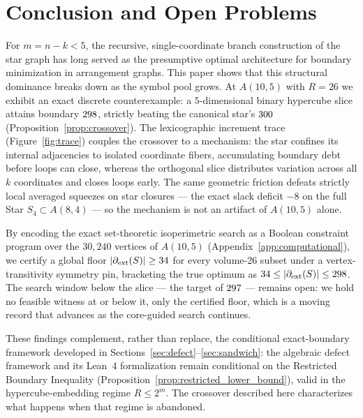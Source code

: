 \section{Conclusion and Open Problems}
\label{sec:conclusion}

For $m = n - k < 5$, the recursive, single-coordinate branch construction of
the star graph has long served as the presumptive optimal architecture for
boundary minimization in arrangement graphs.  This paper shows that this
structural dominance breaks down as the symbol pool grows.  At $A(10,5)$ with
$R = 26$ we exhibit an exact discrete counterexample: a $5$-dimensional binary
hypercube slice attains boundary $298{}$, strictly beating the
canonical star's $300{}$ (Proposition~\ref{prop:crossover}).  The
lexicographic increment trace (Figure~\ref{fig:trace}) couples the crossover to
a mechanism: the star confines its internal adjacencies to isolated coordinate
fibers, accumulating boundary debt before loops can close, whereas the
orthogonal slice distributes variation across all $k$ coordinates and closes
loops early.  The same geometric friction defeats strictly local averaged
squeezes on star closures --- the exact slack deficit $-8$ on the full Star
$S_4 \subset A(8,4)$ --- so the mechanism is not an artifact of $A(10,5)$
alone.

By encoding the exact set-theoretic isoperimetric search as a Boolean
constraint program over the $30{,}240$ vertices of $A(10,5)$
(Appendix~\ref{app:computational}), we certify a global floor
$|\partial_{\mathrm{ext}}(S)| \ge 34{}$ for every volume-$26$ subset under a
vertex-transitivity symmetry pin, bracketing the true optimum as
$34{} \le |\partial_{\mathrm{ext}}(S)| \le 298{}$.  The search window below
the slice --- the target of $297{}$ --- remains open: we hold no
feasible witness at or below it, only the certified floor, which is a moving
record that advances as the core-guided search continues.

These findings complement, rather than replace, the conditional exact-boundary
framework developed in Sections~\ref{sec:defect}--\ref{sec:sandwich}: the
algebraic defect framework and its Lean~4 formalization remain conditional on
the Restricted Boundary Inequality (Proposition~\ref{prop:restricted_lower_bound}),
valid in the hypercube-embedding regime $R \le 2^m$.  The crossover described
here characterizes what happens when that regime is abandoned.

